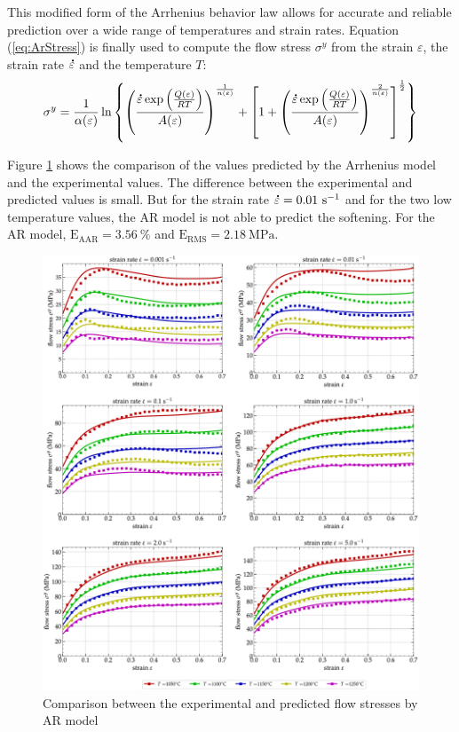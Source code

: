 \documentclass[twoside,english,1p,final,sort&compress]{elsarticle}
\theoremstyle{plain}
\DeclareRobustCommand{\mdot}[1]{\accentset{\mbox{\bfseries .}}{#1}}
\DeclareRobustCommand{\RMSE}{\text{E}_\text{RMS}}
\DeclareRobustCommand{\AARE}{\text{E}_\text{AAR}}
\DeclareRobustCommand{\ps}{\text{s}^{-1}}
\DeclareRobustCommand{\MPa}{\text{MPa}}
\begin{document}
This modified form of the Arrhenius behavior law allows for accurate and reliable prediction over a wide range of temperatures and strain rates.
Equation (\ref{eq:ArStress}) is finally used to compute the flow stress $\sigma^y$ from the strain $\varepsilon$, the strain rate $\mdot\varepsilon$ and the temperature $T$:
\begin{equation}
\sigma^y = \frac{1}{\alpha(\varepsilon)} \ln\left\{\left(\frac{\mdot\varepsilon \exp{\left(\frac{Q(\varepsilon)}{RT}\right)}}{A(\varepsilon)}\right)^{\frac{1}{n(\varepsilon)}} + \left[1 + \left(\frac{\mdot\varepsilon \exp{\left(\frac{Q(\varepsilon)}{RT}\right)}}{A(\varepsilon)}\right)^{\frac{2}{n(\varepsilon)}}\right]^{\frac{1}{2}}\right\}
\label{eq:ArStress}
\end{equation}

Figure \ref{fig:CompExp-AR-6} shows the comparison of the values predicted by the Arrhenius model and the experimental values.
The difference between the experimental and predicted values is small.
But for the strain rate $\mdot\varepsilon = 0.01~\ps$ and for the two low temperature values, the AR model is not able to predict the softening.
For the AR model, $\AARE=3.56~\%$ and $\RMSE=2.18~\MPa$.

\begin{figure}[!ht]
\centering
\includegraphics[width=\columnwidth]
{Figures/CompExp-AR-6}
\caption{Comparison between the experimental and predicted flow stresses by AR model}
\label{fig:CompExp-AR-6}
\end{figure}
\end{document}
